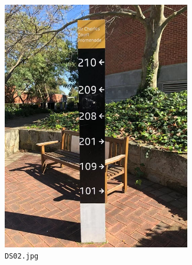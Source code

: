 \documentclass{article}
\begin{document}
\begin{figure}[h]
  \centering
  \begin{subfigure}[h]{0.22\textwidth}
    \centering
    \includegraphics[width=0.9\textwidth]{../train/task2/DS02}
    \caption[DS02]{
      \lstinline{DS02.jpg}
    }
    \label{fig:ds02}
  \end{subfigure}
  \begin{subfigure}[h]{0.22\textwidth}
    \centering

\end{subfigure}
\end{figure}
\end{document}
